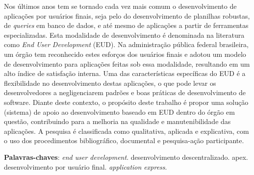 \begin{resumo}

Nos últimos anos tem se tornado cada vez mais comum o desenvolvimento de aplicações por usuários finais, seja pelo do desenvolvimento de planilhas robustas, de \textit{queries} em banco de dados, e até mesmo de aplicações a partir de ferramentas especializadas. Esta modalidade de desenvolvimento é denominada na literatura como \textit{End User Development} (EUD). Na administração pública federal brasileira, um órgão tem reconhecido estes esforços dos usuários finais e adotou um modelo de desenvolvimento para aplicações feitas sob essa modalidade, resultando em um alto índice de satisfação interna. Uma das características específicas do EUD é a flexibilidade no desenvolvimento destas aplicações, o que pode levar os desenvolvedores a negligenciarem padrões e boas práticas de desenvolvimento de software. Diante deste contexto, o propósito deste trabalho é propor uma solução (sistema) de apoio ao desenvolvimento baseado em EUD dentro do órgão em questão, contribuindo para a melhoria na qualidade e manutenibilidade das aplicações. A pesquisa é classificada como qualitativa, aplicada e explicativa, com o uso dos procedimentos bibliográfico, documental e pesquisa-ação participante.




 \vspace{\onelineskip}
    
 \noindent
 \textbf{Palavras-chaves}: \textit{end user development}. desenvolvimento descentralizado. apex. desenvolvimento por usuário final. \textit{application express}.
\end{resumo}
